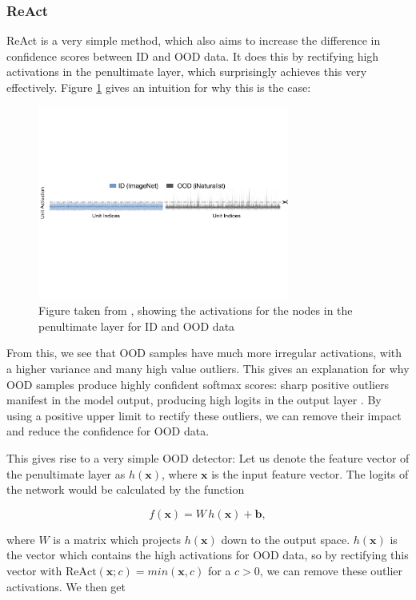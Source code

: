 \documentclass[conference,onecolumn]{IEEEtran}
\begin{document}
\subsubsection{ReAct}

ReAct \cite{react} is a very simple method, which also aims to increase the difference in confidence scores between ID and OOD data. It does this by rectifying high activations in the penultimate layer, which surprisingly achieves this very effectively. Figure \ref{react} gives an intuition for why this is the case:

\begin{figure}[h]
\centerline{\includegraphics[width=3.25in]{figure/react.pdf}}
\caption{Figure taken from \cite{react}, showing the activations for the nodes in the penultimate layer for ID and OOD data}
\label{react}
\end{figure}

From this, we see that OOD samples have much more irregular activations, with a higher variance and many high value outliers. This gives an explanation for why OOD samples produce highly confident softmax scores: sharp positive outliers manifest in the model output, producing high logits in the output layer \cite{react}. By using a positive upper limit to rectify these outliers, we can remove their impact and reduce the confidence for OOD data.

This gives rise to a very simple OOD detector: Let us denote the feature vector of the penultimate layer as $h(\bm{x})$, where $\bm{x}$ is the input feature vector. The logits of the network would be calculated by the function

\begin{equation}\label{dog}
  f(\bm{x}) = W \, h(\bm{x}) + \bm{b},
\end{equation}

where $W$ is a matrix which projects $h(\bm{x})$ down to the output space. $h(\bm{x})$ is the vector which contains the high activations for OOD data, so by rectifying this vector with $\text{ReAct}(\bm{x}; c) = min(\bm{x}, c)$ for a $c > 0$, we can remove these outlier activations. We then get
\end{document}
